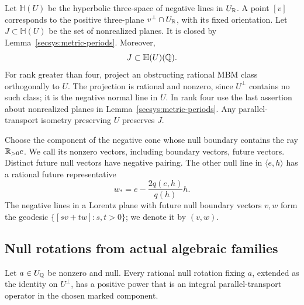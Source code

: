 Let $\mathbb H(U)$ be the hyperbolic three-space of negative lines in
$U_{\mathbb R}$.  A point $[v]$ corresponds to the positive three-plane
$v^\perp\cap U_{\mathbb R}$, with its fixed orientation.  Let
$J\subset\mathbb H(U)$ be the set of nonrealized planes.  It is closed
by Lemma~\ref{secsys:metric-periods}.  Moreover,
\begin{equation}\label{secsys:rational-bad-set}
             J\subset\mathbb H(U)(\mathbb Q).
\end{equation}
For rank greater than four, project an obstructing rational MBM class
orthogonally to $U$.  The projection is rational and nonzero, since
$U^\perp$ contains no such class; it is the negative normal line in
$U$.  In rank four use the last assertion about nonrealized planes in
Lemma~\ref{secsys:metric-periods}.  Any parallel-transport isometry
preserving $U$ preserves $J$.

Choose the component of the negative cone whose null boundary contains
the ray $\mathbb R_{>0}e$.  We call its nonzero vectors, including boundary
vectors, future vectors.  Distinct future null vectors have negative
pairing.  The other null line in $\langle e,h\rangle$ has a rational
future representative
\begin{equation}\label{secsys:other-cusp}
 w_*=e-\frac{2q(e,h)}{q(h)}h.
\end{equation}
The negative lines in a Lorentz plane with future null boundary vectors
$v,w$ form the geodesic
$\{[s v+t w]:s,t>0\}$; we denote it by $(v,w)$.

\subsection{Null rotations from actual algebraic families}

\begin{lemma}\label{secsys:actual-monodromy}
Let $a\in U_{\mathbb Q}$ be nonzero and null.  Every rational null rotation
fixing $a$, extended as the identity on $U^\perp$, has a positive power
that is an integral parallel-transport operator in the chosen marked
component.
\end{lemma}

